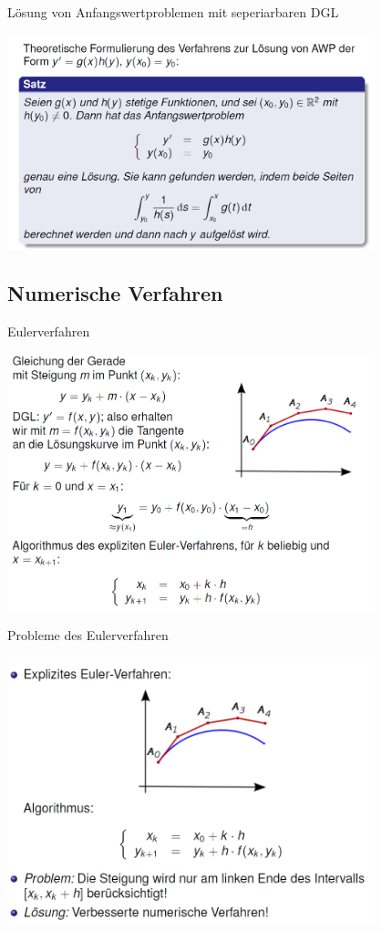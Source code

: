 \begin{definition}{Lösung von Anfangswertproblemen mit seperiarbaren DGL}
  \begin{center}
  \includegraphics[width=0.8\textwidth]{images/2024-06-02-22-21-21.png}
  \end{center}
\end{definition}
\subsection{Numerische Verfahren}
\begin{definition}{Eulerverfahren}
  \begin{center}
  \includegraphics[width=0.8\textwidth]{images/2024-06-02-22-23-19.png}
  \end{center}
\end{definition}
\begin{definition}{Probleme des Eulerverfahren}
  \begin{center}
  \includegraphics[width=0.8\textwidth]{images/2024-06-02-22-24-08.png}
  \end{center}
\end{definition}
